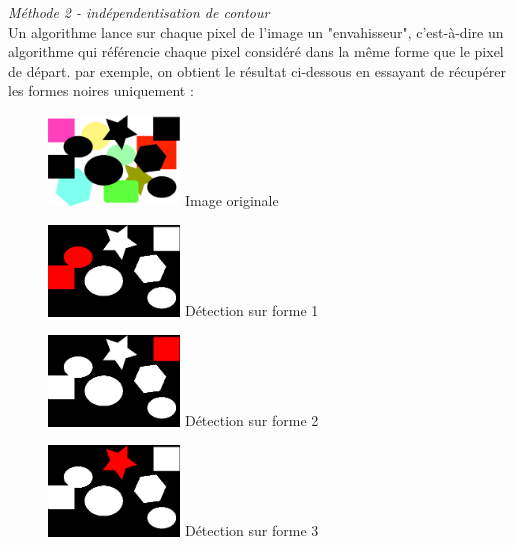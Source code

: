 \documentclass{article}
\begin{document}
			\emph{Méthode 2 - indépendentisation de contour}\\
			Un algorithme lance sur chaque pixel de l'image un "envahisseur", c'est-à-dire un algorithme qui référencie chaque pixel considéré dans la même forme que le pixel de départ. par exemple, on obtient le résultat ci-dessous en essayant de récupérer les formes noires uniquement :
			\begin{figure}[!ht]
				\centering
				\begin{minipage}[t]{3.5cm}
					\centering
					\includegraphics[width=3.5cm]{Vectorization/shape.jpg}
					Image originale
				\end{minipage}
				\begin{minipage}[t]{3.5cm}
					\centering
					\includegraphics[width=3.5cm]{Vectorization/shapeDetection1.jpg}
					Détection sur forme 1
				\end{minipage}
				\begin{minipage}[t]{3.5cm}
					\centering
					\includegraphics[width=3.5cm]{Vectorization/shapeDetection2.jpg}
					Détection sur forme 2
				\end{minipage}
				\begin{minipage}[t]{3.5cm}
					\centering
					\includegraphics[width=3.5cm]{Vectorization/shapeDetection3.jpg}
					Détection sur forme 3
				\end{minipage}
			\end{figure}\\
\end{document}
